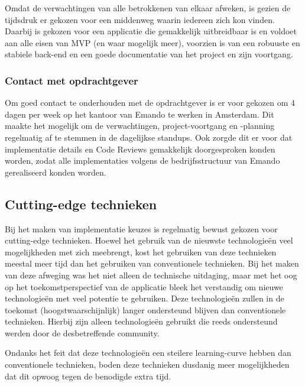 Omdat de verwachtingen van alle betrokkenen van elkaar afweken, is gezien de tijdsdruk er gekozen voor een middenweg waarin iedereen zich kon vinden. Daarbij is gekozen voor een applicatie die gemakkelijk uitbreidbaar is en voldoet aan alle eisen van MVP (en waar mogelijk meer), voorzien is van een robuuste en stabiele back-end en een goede documentatie van het project en zijn voortgang.  

\subsubsection{Contact met opdrachtgever}
Om goed contact te onderhouden met de opdrachtgever is er voor gekozen om 4 dagen per week op het kantoor van Emando te werken in Amsterdam. Dit maakte het mogelijk om de verwachtingen, project-voortgang en -planning regelmatig af te stemmen in de dagelijkse standups. Ook zorgde dit er voor dat implementatie details en Code Reviews gemakkelijk doorgesproken konden worden, zodat alle implementaties volgens de bedrijfsstructuur van Emando gerealiseerd konden worden.

\subsection{Cutting-edge technieken}
Bij het maken van implementatie keuzes is regelmatig bewust gekozen voor cutting-edge technieken. Hoewel het gebruik van de nieuwste technologieën veel mogelijkheden met zich meebrengt, kost het gebruiken van deze technieken meestal meer tijd dan het gebruiken van conventionele technieken. Bij het maken van deze afweging was het niet alleen de technische uitdaging, maar met het oog op het toekomstperspectief van de applicatie bleek het verstandig om nieuwe technologieën met veel potentie te gebruiken. Deze technologieën zullen in de toekomst (hoogstwaarschijnlijk) langer ondersteund blijven dan conventionele technieken.
Hierbij zijn alleen technologieën gebruikt die reeds ondersteund werden door de desbetreffende community.

Ondanks het feit dat deze technologieën een steilere learning-curve hebben dan conventionele technieken, boden deze technieken dusdanig meer mogelijkheden dat dit opwoog tegen de benodigde extra tijd.